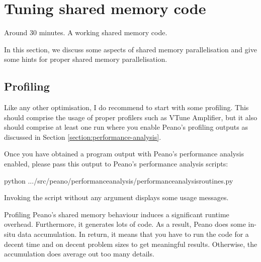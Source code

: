 \section{Tuning shared memory code}


\chapterDescription
  {
    Around 30 minutes.
  }
  {
    A working shared memory code.
  }


In this section, we discuss some aspects of shared memory parallelisation and
give some hints for proper shared memory parallelisation.


\subsection{Profiling}

Like any other optimisation, I do recommend to start with some profiling. This
should comprise the usage of proper profilers such as VTune Amplifier, but it
also should comprise at least one run where you
enable Peano's profiling outputs as discussed in
Section \ref{section:performance-analysis}.

Once you have obtained a program output with Peano's performance analysis
enabled, please pass this output to Peano's performance analysis scripts:
\begin{code}
python .../src/peano/performanceanalysis/performanceanalysisroutines.py
\end{code}
\noindent
Invoking the script without any argument displays some usage messages.


\begin{remark}
 Profiling Peano's shared memory behaviour induces a significant runtime
 overhead. Furthermore, it generates lots of code. As a result, Peano does some
 in-situ data accumulation. In return, it means that you have to run the code
 for a decent time and on decent problem sizes to get meaningful results.
 Otherwise, the accumulation does average out too many details.
\end{remark}

